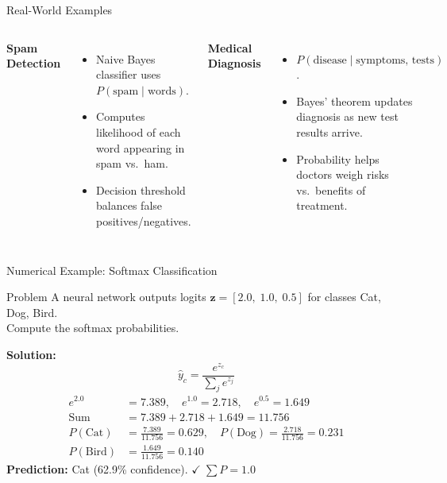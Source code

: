 \begin{frame}{Real-World Examples}
\begin{columns}[T]
\textbf{Spam Detection}
\begin{itemize}
    \item Naive Bayes classifier uses $P(\text{spam}\mid\text{words})$.
    \item Computes likelihood of each word appearing in spam vs.\ ham.
    \item Decision threshold balances false positives/negatives.
\end{itemize}
\textbf{Medical Diagnosis}
\begin{itemize}
    \item $P(\text{disease}\mid\text{symptoms, tests})$.
    \item Bayes' theorem updates diagnosis as new test results arrive.
    \item Probability helps doctors weigh risks vs.\ benefits of treatment.
\end{itemize}
\end{columns}
\end{frame}

\begin{frame}{Numerical Example: Softmax Classification}
\begin{exampleblock}{Problem}
A neural network outputs logits $\mathbf{z} = [2.0,\; 1.0,\; 0.5]$ for classes Cat, Dog, Bird.\\
Compute the softmax probabilities.
\end{exampleblock}
\textbf{Solution:}
\[
\hat{y}_c = \frac{e^{z_c}}{\sum_j e^{z_j}}
\]
\begin{align*}
e^{2.0} &= 7.389, \quad e^{1.0} = 2.718, \quad e^{0.5} = 1.649\\[4pt]
\text{Sum} &= 7.389 + 2.718 + 1.649 = 11.756\\[4pt]
P(\text{Cat}) &= \frac{7.389}{11.756} = \mathbf{0.629}, \quad
P(\text{Dog}) = \frac{2.718}{11.756} = \mathbf{0.231}\\[2pt]
P(\text{Bird}) &= \frac{1.649}{11.756} = \mathbf{0.140}
\end{align*}
\textbf{Prediction:} Cat (62.9\% confidence). \quad $\checkmark\; \sum P = 1.0$
\end{frame}
